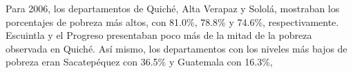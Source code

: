 Para 2006, los departamentos de Quiché, Alta Verapaz y Sololá, mostraban los porcentajes de pobreza más altos, con 81.0\%, 78.8\% y 74.6\%, respectivamente. Escuintla y el Progreso presentaban poco más de la mitad de la pobreza observada en Quiché. Así mismo, los departamentos con los niveles más bajos de pobreza eran Sacatepéquez con 36.5\% y Guatemala con  16.3\%, 